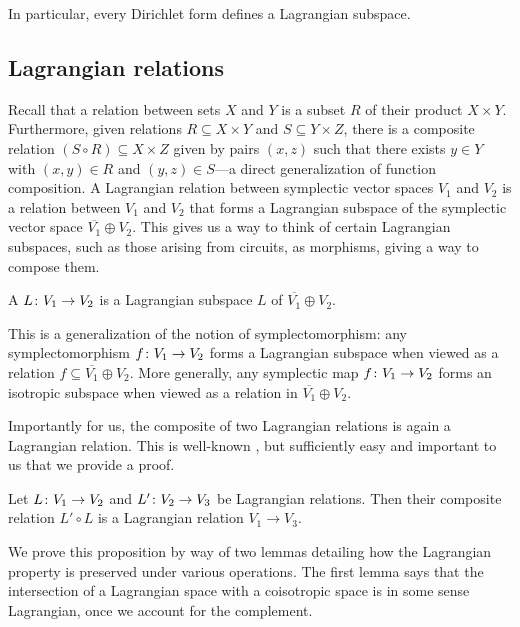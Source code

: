 In particular, every Dirichlet form defines a Lagrangian subspace. 

\subsection{Lagrangian relations}

Recall that a relation between sets $X$ and $Y$ is a subset $R$ of their product
$X \times Y$. Furthermore, given relations $R \subseteq X \times Y$ and $S
\subseteq Y \times Z$, there is a composite relation $(S \circ R) \subseteq X
\times Z$ given by pairs $(x,z)$ such that there exists $y \in Y$ with $(x,y)
\in R$ and $(y,z) \in S$---a direct generalization of function composition. A
Lagrangian relation between symplectic vector spaces $V_1$ and $V_2$ is a
relation between $V_1$ and $V_2$ that forms a Lagrangian subspace of the
symplectic vector space $\overline{V_1} \oplus V_2$. This gives us a
way to think of certain Lagrangian subspaces, such as those arising from
circuits, as morphisms, giving a way to compose them.

\begin{definition}
  A  $L{\colon} V_1 \to V_2$ is a Lagrangian subspace $L$
  of $\overline{V_1} \oplus V_2$. 
\end{definition}

This is a generalization of the notion of symplectomorphism: any symplectomorphism
$f{\colon} V_1 \to V_2$ forms a Lagrangian subspace when viewed as a
relation $f \subseteq \overline{V_1} \oplus V_2$. More generally, any symplectic
map $f{\colon} V_1 \to V_2$ forms an isotropic subspace when viewed as a relation in
$\overline{V_1} \oplus V_2$. 

Importantly for us, the composite of two Lagrangian relations is again a
Lagrangian relation.  This is well-known \cite{Weinstein}, but sufficiently 
easy and important to us that we provide a proof.

\begin{proposition} \label{prop:lagrangian_composition}
  Let $L{\colon} V_1 \to V_2$ and $L'{\colon} V_2 \to V_3$ be Lagrangian relations. Then their
  composite relation $L' \circ L$ is a Lagrangian relation $V_1 \to V_3$.
\end{proposition}

We prove this proposition by way of two lemmas detailing how the Lagrangian
property is preserved under various operations. The first lemma says that the
intersection of a Lagrangian space with a coisotropic space is in some sense
Lagrangian, once we account for the complement.

